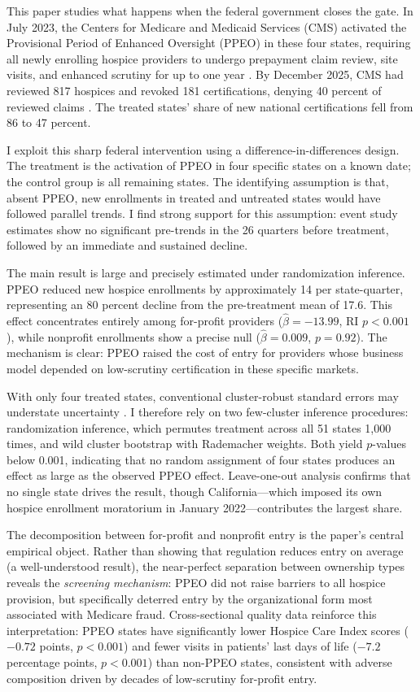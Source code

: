 \documentclass[12pt]{article}
\begin{document}
This paper studies what happens when the federal government closes the gate. In July 2023, the Centers for Medicare and Medicaid Services (CMS) activated the Provisional Period of Enhanced Oversight (PPEO) in these four states, requiring all newly enrolling hospice providers to undergo prepayment claim review, site visits, and enhanced scrutiny for up to one year \citep{cms2023ppeo}. By December 2025, CMS had reviewed 817 hospices and revoked 181 certifications, denying 40 percent of reviewed claims \citep{cms2025update}. The treated states' share of new national certifications fell from 86 to 47 percent.

I exploit this sharp federal intervention using a difference-in-differences design. The treatment is the activation of PPEO in four specific states on a known date; the control group is all remaining states. The identifying assumption is that, absent PPEO, new enrollments in treated and untreated states would have followed parallel trends. I find strong support for this assumption: event study estimates show no significant pre-trends in the 26 quarters before treatment, followed by an immediate and sustained decline.

The main result is large and precisely estimated under randomization inference. PPEO reduced new hospice enrollments by approximately 14 per state-quarter, representing an 80 percent decline from the pre-treatment mean of 17.6. This effect concentrates entirely among for-profit providers ($\hat{\beta} = -13.99$, RI $p < 0.001$), while nonprofit enrollments show a precise null ($\hat{\beta} = 0.009$, $p = 0.92$). The mechanism is clear: PPEO raised the cost of entry for providers whose business model depended on low-scrutiny certification in these specific markets.

With only four treated states, conventional cluster-robust standard errors may understate uncertainty \citep{mackinnon2015wild}. I therefore rely on two few-cluster inference procedures: randomization inference, which permutes treatment across all 51 states 1,000 times, and wild cluster bootstrap with Rademacher weights. Both yield $p$-values below 0.001, indicating that no random assignment of four states produces an effect as large as the observed PPEO effect. Leave-one-out analysis confirms that no single state drives the result, though California---which imposed its own hospice enrollment moratorium in January 2022---contributes the largest share.

The decomposition between for-profit and nonprofit entry is the paper's central empirical object. Rather than showing that regulation reduces entry on average (a well-understood result), the near-perfect separation between ownership types reveals the \textit{screening mechanism}: PPEO did not raise barriers to all hospice provision, but specifically deterred entry by the organizational form most associated with Medicare fraud. Cross-sectional quality data reinforce this interpretation: PPEO states have significantly lower Hospice Care Index scores ($-0.72$ points, $p < 0.001$) and fewer visits in patients' last days of life ($-7.2$ percentage points, $p < 0.001$) than non-PPEO states, consistent with adverse composition driven by decades of low-scrutiny for-profit entry.
\end{document}
